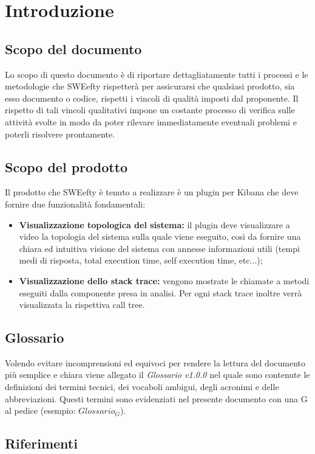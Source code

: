 \section{Introduzione}
	\subsection{Scopo del documento}
	Lo scopo di questo documento è di riportare dettagliatamente tutti i processi e le metodologie che SWEefty rispetterà per assicurarsi che qualsiasi prodotto, sia esso documento o codice, rispetti i vincoli di qualità imposti dal proponente.
	Il rispetto di tali vincoli qualitativi impone un costante processo di verifica sulle attività svolte in modo da poter rilevare immediatamente eventuali problemi e poterli risolvere prontamente.
	
	\subsection{Scopo del prodotto}
	Il prodotto che SWEefty è tenuto a  realizzare è un plugin per Kibana che deve fornire due funzionalità fondamentali:
	\begin{itemize}
		\item \textbf{Visualizzazione topologica del sistema:} il plugin deve visualizzare a video la topologia del sistema sulla quale viene eseguito, così da fornire una chiara ed intuitiva visione del sistema con annesse informazioni utili (tempi medi di risposta, total execution time, self execution time, etc...);
		\item \textbf{Visualizzazione dello stack trace:} vengono mostrate le chiamate a metodi eseguiti dalla componente presa in analisi. Per ogni stack trace inoltre verrà visualizzata la rispettiva call tree.
	\end{itemize}

	\subsection{Glossario}
	Volendo evitare incomprensioni  ed equivoci per rendere la lettura del documento più semplice e chiara viene allegato il \emph{Glossario v1.0.0} nel quale sono contenute le definizioni dei termini tecnici, dei vocaboli ambigui, degli acronimi e delle abbreviazioni. Questi termini sono evidenziati nel presente documento con una G al pedice (esempio: $Glossario_{G}$).
	\subsection{Riferimenti}
